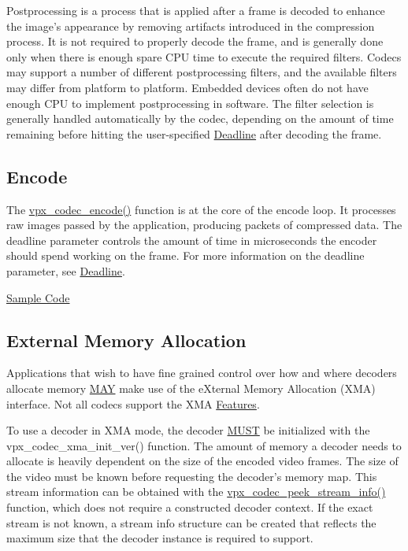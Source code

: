 Postprocessing is a process that is applied after a frame is decoded to enhance the image's appearance by removing artifacts introduced in the compression process. It is not required to properly decode the frame, and is generally done only when there is enough spare C\+P\+U time to execute the required filters. Codecs may support a number of different postprocessing filters, and the available filters may differ from platform to platform. Embedded devices often do not have enough C\+P\+U to implement postprocessing in software. The filter selection is generally handled automatically by the codec, depending on the amount of time remaining before hitting the user-\/specified \hyperlink{usage_usage_deadline}{Deadline} after decoding the frame. \hypertarget{usage_encode}{}\subsection{Encode}\label{usage_encode}
The \hyperlink{group__encoder_gaf990542e2aeb389f05fae3e9c7803639}{vpx\+\_\+codec\+\_\+encode()} function is at the core of the encode loop. It processes raw images passed by the application, producing packets of compressed data. The {\ttfamily deadline} parameter controls the amount of time in microseconds the encoder should spend working on the frame. For more information on the {\ttfamily deadline} parameter, see \hyperlink{usage_usage_deadline}{Deadline}.

\hyperlink{samples}{Sample Code} \hypertarget{usage_xma}{}\subsection{External Memory Allocation}\label{usage_xma}
Applications that wish to have fine grained control over how and where decoders allocate memory \hyperlink{rfc2119_MAY}{M\+A\+Y} make use of the e\+Xternal Memory Allocation (X\+M\+A) interface. Not all codecs support the X\+M\+A \hyperlink{usage_usage_features}{Features}.

To use a decoder in X\+M\+A mode, the decoder \hyperlink{rfc2119_MUST}{M\+U\+S\+T} be initialized with the vpx\+\_\+codec\+\_\+xma\+\_\+init\+\_\+ver() function. The amount of memory a decoder needs to allocate is heavily dependent on the size of the encoded video frames. The size of the video must be known before requesting the decoder's memory map. This stream information can be obtained with the \hyperlink{group__decoder_gadfee4664d644175d5aac1465ef11c4b0}{vpx\+\_\+codec\+\_\+peek\+\_\+stream\+\_\+info()} function, which does not require a constructed decoder context. If the exact stream is not known, a stream info structure can be created that reflects the maximum size that the decoder instance is required to support.

